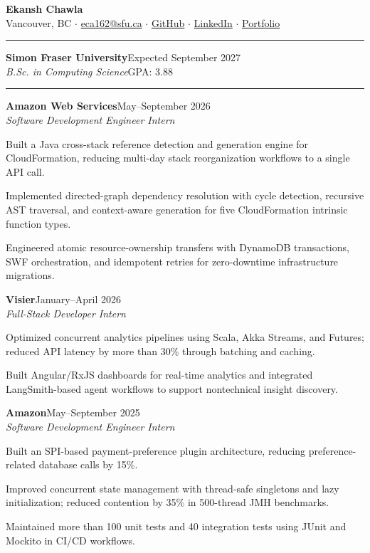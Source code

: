 \documentclass[10pt,letterpaper]{article}
\renewenvironment{itemize}{\begin{list}{\textbullet}{\setlength{\leftmargin}{13pt}\setlength{\itemsep}{2pt}\setlength{\topsep}{3pt}\setlength{\parsep}{0pt}}}{\end{list}}
\renewcommand{\section}[1]{\par\vspace{9pt}{\large\bfseries #1}\par\vspace{2pt}\hrule\vspace{5pt}}
\newcommand{\entry}[4]{\textbf{#1}\hfill #2\\\textit{#3}\hfill #4}
\begin{document}
{\LARGE\bfseries Ekansh Chawla}\\[4pt]
Vancouver, BC $\cdot$ \href{mailto:eca162@sfu.ca}{eca162@sfu.ca} $\cdot$ \href{https://github.com/Ekanshthegreat}{GitHub} $\cdot$ \href{https://ca.linkedin.com/in/ekansh-chawla-80a3b2218}{LinkedIn} $\cdot$ \href{https://dynamic-portfolio-pi.vercel.app/}{Portfolio}

\section{Education}
\entry{Simon Fraser University}{Expected September 2027}{B.Sc. in Computing Science}{GPA: 3.88}

\section{Experience}
\entry{Amazon Web Services}{May--September 2026}{Software Development Engineer Intern}{}
\begin{itemize}
\item Built a Java cross-stack reference detection and generation engine for CloudFormation, reducing multi-day stack reorganization workflows to a single API call.
\item Implemented directed-graph dependency resolution with cycle detection, recursive AST traversal, and context-aware generation for five CloudFormation intrinsic function types.
\item Engineered atomic resource-ownership transfers with DynamoDB transactions, SWF orchestration, and idempotent retries for zero-downtime infrastructure migrations.
\end{itemize}
\entry{Visier}{January--April 2026}{Full-Stack Developer Intern}{}
\begin{itemize}
\item Optimized concurrent analytics pipelines using Scala, Akka Streams, and Futures; reduced API latency by more than 30\% through batching and caching.
\item Built Angular/RxJS dashboards for real-time analytics and integrated LangSmith-based agent workflows to support nontechnical insight discovery.
\end{itemize}
\entry{Amazon}{May--September 2025}{Software Development Engineer Intern}{}
\begin{itemize}
\item Built an SPI-based payment-preference plugin architecture, reducing preference-related database calls by 15\%.
\item Improved concurrent state management with thread-safe singletons and lazy initialization; reduced contention by 35\% in 500-thread JMH benchmarks.
\item Maintained more than 100 unit tests and 40 integration tests using JUnit and Mockito in CI/CD workflows.
\end{itemize}
\end{document}
